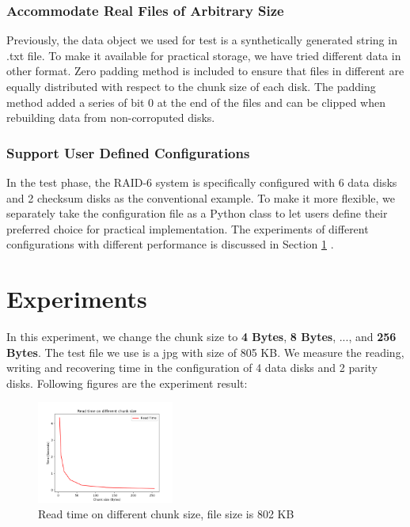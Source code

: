 \documentclass[journal]{IEEEtran}
\begin{document}
\subsubsection{Accommodate Real Files of Arbitrary Size} Previously, the data object we used for test is a synthetically generated string in .txt file. To make it available for practical storage, we have tried different data in other format. Zero padding method is included to ensure that files in different are equally distributed with respect to the chunk size of each disk. The padding  method added a series of bit 0 at the end of the files and can be clipped when rebuilding data from non-corroputed disks.

\subsubsection{Support User Defined Configurations } In the test phase, the RAID-6 system is specifically configured with 6 data disks and 2 checksum disks as the conventional example.  To make it more flexible, we separately take the configuration file as a Python class to let users define their preferred choice for practical implementation. The experiments of different configurations with different performance is discussed in Section \ref{sec5} . 

\section{Experiments}

\label{sec5}

In this experiment, we change the chunk size to \textbf{4 Bytes}, \textbf{8 Bytes}, ..., and \textbf{256 Bytes}. The test file we use is a jpg with size of 805 KB. We measure the reading, writing and recovering time in the configuration of 4 data disks and 2 parity disks. Following figures are the experiment result:


\begin{figure}[htbp]

	\centering

	\captionsetup{justification=centering}

	\includegraphics[width=0.4\textwidth]{fig/result_read.png}

	\caption{Read time on different chunk size, file size is 802 KB}

\end{figure}
\end{document}
